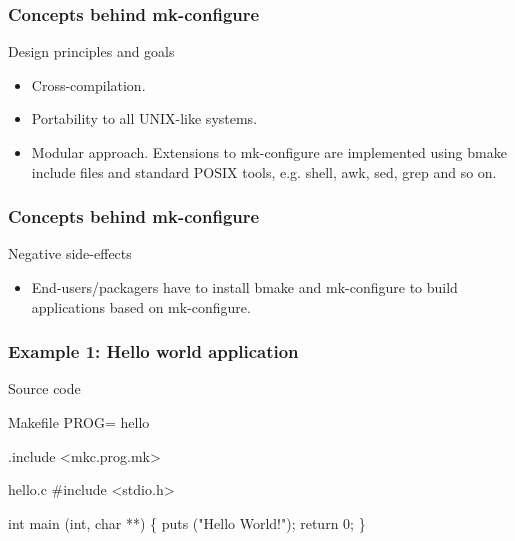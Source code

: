 \documentclass[hyperref={colorlinks=true}]{beamer}
\begin{document}
\begin{frame}
  \frametitle{Concepts behind mk-configure}
  \begin{block}{Design principles and goals}
    \begin{itemize}
    \item Cross-compilation.
    \item Portability to all UNIX-like systems.
    \item Modular approach. Extensions to mk-configure are implemented
      using bmake include files and standard POSIX tools, e.g. shell,
      awk, sed, grep and so on.
    \end{itemize}
  \end{block}
\end{frame}

\begin{frame}
  \frametitle{Concepts behind mk-configure}
  \begin{block}{Negative side-effects}
    \begin{itemize}
    \item End-users/packagers have to install bmake and
      mk-configure to build applications based on mk-configure.
    \end{itemize}
  \end{block}
\end{frame}

\begin{frame}[fragile]
  \frametitle{Example 1: Hello world application}

  \begin{block}{Source code}


      \begin{Code}{Makefile}
PROG=      hello

.include <mkc.prog.mk>
      \end{Code}

      \begin{Code}{hello.c}
#include <stdio.h>

int main (int, char **)
\{
   puts ("Hello World!");
   return 0;
\}
      \end{Code}
  \end{block}
\end{frame}
\end{document}
